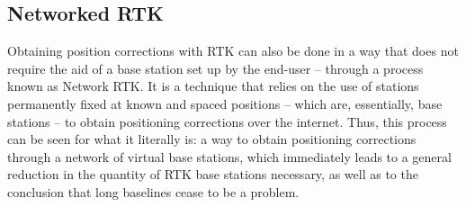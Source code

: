


\subsection{Networked RTK}\label{sec:II_networkedRTK}

Obtaining position corrections with RTK can also be done in a way that does not require the aid of a base station set up by the end-user -- through a process known as Network RTK.
It is a technique that relies on the use of stations permanently fixed at known and spaced positions -- which are, essentially, base stations -- to obtain positioning corrections over the internet. Thus, this process can be seen for what it literally is: a way to obtain positioning corrections through a network of virtual base stations, which immediately leads to a general reduction in the quantity of RTK base stations necessary, as well as to the conclusion that long baselines cease to be a problem.

